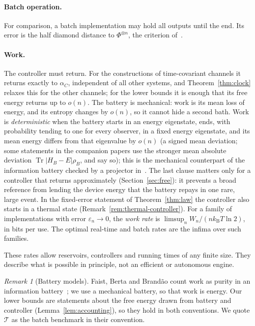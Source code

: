 \documentclass[11pt]{article}
\theoremstyle{definition}
\theoremstyle{remark}
\newtheorem{remark}{Remark}
\newcommand{\Tr}{\operatorname{Tr}}
\newcommand{\kB}{k_{\mathrm B}}
\newcommand{\Tcap}{\mathcal T}
\begin{document}
\paragraph{Batch operation.} For comparison, a batch implementation may hold all outputs until the end. Its error is the half diamond distance to $\Phi^{\otimes n}$, the criterion of~\cite{FBB21}.

\paragraph{Work.} The controller must return. For the constructions of time-covariant channels it returns exactly to $\alpha_C$, independent of all other systems, and Theorem~\ref{thm:clock} relaxes this for the other channels; for the lower bounds it is enough that its free energy returns up to $o(n)$. The battery is mechanical: work is its mean loss of energy, and its entropy changes by $o(n)$, so it cannot hide a second bath. Work is \emph{deterministic} when the battery starts in an energy eigenstate, ends, with probability tending to one for every observer, in a fixed energy eigenstate, and its mean energy differs from that eigenvalue by $o(n)$ (a signed mean deviation; some statements in the companion papers use the stronger mean absolute deviation $\Tr|H_B-E|\rho_B$, and say so); this is the mechanical counterpart of the information battery checked by a projector in~\cite{FR18,FBB21}. The last clause matters only for a controller that returns approximately (Section~\ref{sec:free}): it prevents a broad reference from lending the device energy that the battery repays in one rare, large event. In the fixed-error statement of Theorem~\ref{thm:law} the controller also starts in a thermal state (Remark~\ref{rem:thermal-controller}). For a family of implementations with error $\varepsilon_n\to0$, the \emph{work rate} is $\limsup_n W_n/(n\kB T\ln 2)$, in bits per use. The optimal real-time and batch rates are the infima over such families.

These rates allow reservoirs, controllers and running times of any finite size. They describe what is possible in principle, not an efficient or autonomous engine.

\begin{remark}[Battery models]
Faist, Berta and Brand\~ao count work as purity in an information battery~\cite{FR18,FBB21}; we use a mechanical battery, so that work is energy. Our lower bounds are statements about the free energy drawn from battery and controller (Lemma~\ref{lem:accounting}), so they hold in both conventions. We quote $\Tcap$ as the batch benchmark in their convention.
\end{remark}
\end{document}

